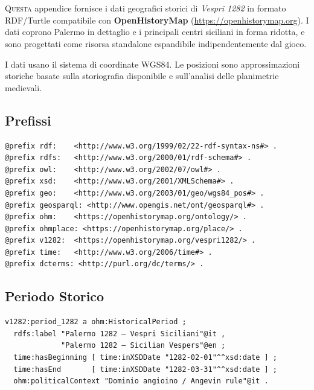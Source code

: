 
\chapter{}

\lettrine[lines=3]{Q}{uesta} appendice fornisce i dati geografici
storici di \textit{Vespri 1282} in formato RDF/Turtle compatibile
con \textbf{OpenHistoryMap} (\url{https://openhistorymap.org}).
I dati coprono Palermo in dettaglio e i principali centri siciliani
in forma ridotta, e sono progettati come risorsa standalone
espandibile indipendentemente dal gioco.

I dati usano il sistema di coordinate WGS84. Le posizioni sono
approssimazioni storiche basate sulla storiografia disponibile
e sull'analisi delle planimetrie medievali.

\section{Prefissi}

\begin{verbatim}
@prefix rdf:    <http://www.w3.org/1999/02/22-rdf-syntax-ns#> .
@prefix rdfs:   <http://www.w3.org/2000/01/rdf-schema#> .
@prefix owl:    <http://www.w3.org/2002/07/owl#> .
@prefix xsd:    <http://www.w3.org/2001/XMLSchema#> .
@prefix geo:    <http://www.w3.org/2003/01/geo/wgs84_pos#> .
@prefix geosparql: <http://www.opengis.net/ont/geosparql#> .
@prefix ohm:    <https://openhistorymap.org/ontology/> .
@prefix ohmplace: <https://openhistorymap.org/place/> .
@prefix v1282:  <https://openhistorymap.org/vespri1282/> .
@prefix time:   <http://www.w3.org/2006/time#> .
@prefix dcterms: <http://purl.org/dc/terms/> .
\end{verbatim}

\section{Periodo Storico}

\begin{verbatim}
v1282:period_1282 a ohm:HistoricalPeriod ;
  rdfs:label "Palermo 1282 — Vespri Siciliani"@it ,
             "Palermo 1282 — Sicilian Vespers"@en ;
  time:hasBeginning [ time:inXSDDate "1282-02-01"^^xsd:date ] ;
  time:hasEnd       [ time:inXSDDate "1282-03-31"^^xsd:date ] ;
  ohm:politicalContext "Dominio angioino / Angevin rule"@it .
\end{verbatim}

